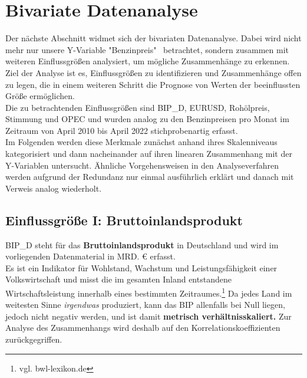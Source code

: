\section{Bivariate Datenanalyse}
Der nächste Abschnitt widmet sich der bivariaten Datenanalyse. Dabei wird nicht mehr nur unsere Y-Variable "Benzinpreis" \, betrachtet, sondern zusammen mit weiteren Einflussgrößen analysiert, um mögliche Zusammenhänge zu erkennen. Ziel der Analyse ist es, Einflussgrößen zu identifizieren und Zusammenhänge offen zu legen, die in einem weiteren Schritt die Prognose von Werten der beeinflussten Größe ermöglichen.\\
Die zu betrachtenden Einflussgrößen sind BIP\_D, EURUSD, Rohölpreis, Stimmung und OPEC und wurden analog zu den Benzinpreisen pro Monat im Zeitraum von April 2010 bis April 2022 stichprobenartig erfasst.\\
Im Folgenden werden diese Merkmale zunächst anhand ihres Skalenniveaus kategorisiert und dann nacheinander auf ihren linearen Zusammenhang mit der Y-Variablen untersucht. Ähnliche Vorgehensweisen in den Analyseverfahren werden aufgrund der Redundanz nur einmal ausführlich erklärt und danach mit Verweis analog wiederholt.\\



\subsection{Einflussgröße I: Bruttoinlandsprodukt}
BIP\_D steht für das \textbf{Bruttoinlandsprodukt} in Deutschland und wird im vorliegenden Datenmaterial in MRD. € erfasst.\\
Es ist ein Indikator für Wohlstand, Wachstum und Leistungsfähigkeit einer Volkswirtschaft und misst die im gesamten Inland entstandene Wirtschaftsleistung innerhalb eines bestimmten Zeitraumes.\footnote{vgl. bwl-lexikon.de} Da jedes Land im weitesten Sinne \textit{irgendwas} produziert, kann das BIP allenfalls bei Null liegen, jedoch nicht negativ werden, und ist damit \textbf{metrisch verhältnisskaliert.} Zur Analyse des Zusammenhangs wird deshalb auf den Korrelationskoeffizienten zurückgegriffen.\\

